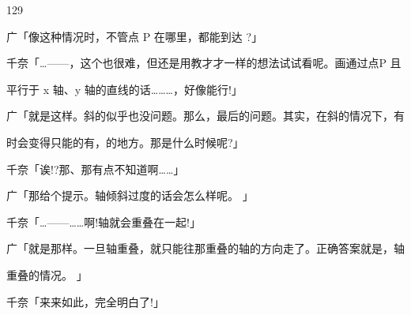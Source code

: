 129\par
广「像这种情况时，不管点 P 在哪里，都能到达 ?」\par
千奈「…——，这个也很难，但还是用教才才一样的想法试试看呢。画通过点P 且\par
平行于 x 轴、y 轴的直线的话………，好像能行!」\par
广「就是这样。斜的似乎也没问题。那么，最后的问题。其实，在斜的情况下，有\par
时会变得只能的有，的地方。那是什么时候呢?」\par
千奈「诶!?那、那有点不知道啊……」\par
广「那给个提示。轴倾斜过度的话会怎么样呢。 」\par
千奈「…——……啊!轴就会重叠在一起!」\par
广「就是那样。一旦轴重叠，就只能往那重叠的轴的方向走了。正确答案就是，轴\par
重叠的情况。 」\par
千奈「来来如此，完全明白了!」\par

